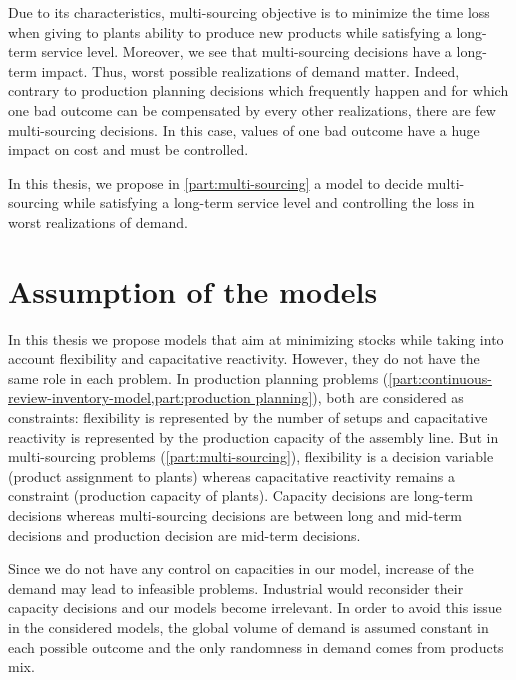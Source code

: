 Due to its characteristics, multi-sourcing objective is to minimize the time loss when giving to plants ability to produce new products while satisfying a long-term service level.
Moreover, we see that multi-sourcing decisions have a long-term impact.
Thus, worst possible realizations of demand matter.
Indeed, contrary to production planning decisions which frequently happen and for which one bad outcome can be compensated by every other realizations, there are few multi-sourcing decisions.
In this case, values of one bad outcome have a huge impact on cost and must be controlled.


\medskip


In this thesis, we propose in \cref{part:multi-sourcing} a model to decide multi-sourcing while satisfying a long-term service level and controlling the loss in worst realizations of demand.



\section{Assumption of the models}




In this thesis we propose models that aim at minimizing stocks while taking into account flexibility and capacitative reactivity.
However, they do not have the same role in each problem.
In production planning problems (\cref{part:continuous-review-inventory-model,part:production planning}), both are considered as constraints: flexibility is represented by the number of setups and capacitative reactivity is represented by the production capacity of the assembly line.
But in multi-sourcing problems (\cref{part:multi-sourcing}), flexibility is a decision variable (product assignment to plants) whereas capacitative reactivity remains a constraint (production capacity of plants).
Capacity decisions are long-term decisions whereas multi-sourcing decisions are between long and mid-term decisions and production decision are mid-term decisions.


Since we do not have any control on capacities in our model, increase of the demand may lead to infeasible problems.
Industrial would reconsider their capacity decisions and our models become irrelevant.
In order to avoid this issue in the considered models, the global volume of demand is assumed constant in each possible outcome and the only randomness in demand comes from products mix.


